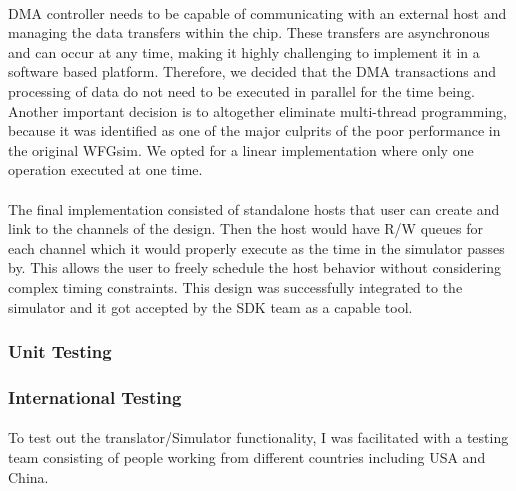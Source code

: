 \paragraph{}
DMA controller needs to be capable of communicating with an external host and managing the data transfers within the chip. These transfers are asynchronous and can occur at any time, making it highly challenging to implement it in a software based platform. Therefore, we decided that the DMA transactions and processing of data do not need to be executed in parallel for the time being. Another important decision is to altogether eliminate multi-thread programming, because it was identified as one of the major culprits of the poor performance in the original WFGsim. We opted for a linear implementation where only one operation executed at one time.

\paragraph{}
The final implementation consisted of standalone hosts that user can create and link to the channels of the design. Then the host would have R/W queues for each channel which it would properly execute as the time in the simulator passes by. This allows the user to freely schedule the host behavior without considering complex timing constraints. This design was successfully integrated to the simulator and it got accepted by the SDK team as a capable tool.

\subsubsection{Unit Testing}
\label{sec:unittest}

\subsubsection{International Testing}
\paragraph{}
To test out the translator/Simulator functionality, I was facilitated with a testing team consisting of people working from different countries including USA and China.

